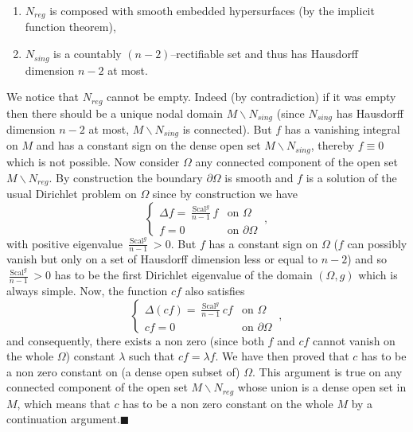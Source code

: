 \documentclass[a4paper,11pt,leqno]{amsart}
\numberwithin{equation}{section}
\theoremstyle{main}
\begin{document}
\begin{enumerate}
	\item $N_{reg}$ is composed with smooth embedded hypersurfaces (by the implicit function theorem),
	\item $N_{sing}$ is a countably $(n-2)$--rectifiable set and thus has Hausdorff dimension $n-2$ at most.
\end{enumerate}
We notice that $N_{reg}$ cannot be empty. Indeed (by contradiction) if it was empty then there should be a unique nodal domain $M\smallsetminus N_{sing}$ (since $N_{sing}$ has Hausdorff dimension $n-2$ at most, $M\smallsetminus N_{sing}$ is connected). But $f$ has a vanishing integral on $M$ and has a constant sign on the dense open set $M\smallsetminus N_{sing}$, thereby $f\equiv 0$ which is not possible. Now consider $\Omega$ any connected component of the open set $M\smallsetminus N_{reg}$. By construction the boundary $\partial\Omega$ is smooth and $f$ is a solution of the usual Dirichlet problem on $\Omega$ since by construction we have 
$$\left\{
\begin{array}{cl}
	\Delta f=\frac{{\operatorname{Scal}}^g}{n-1}f& \textrm{on } \Omega  \\
	f=0 & \textrm{on } \partial\Omega
\end{array}\right. \ ,$$
with positive eigenvalue $\frac{{\operatorname{Scal}}^g}{n-1}>0$. But $f$ has a constant sign on $\Omega$ ($f$ can possibly vanish but only on a set of Hausdorff dimension less or equal to $n-2$) and so $\frac{{\operatorname{Scal}}^g}{n-1}>0$ has to be the first Dirichlet eigenvalue of the domain $(\Omega,g)$ which is always simple. Now, the function $cf$ also satisfies
$$\left\{
\begin{array}{cl}
	\Delta (cf)=\frac{{\operatorname{Scal}}^g}{n-1}cf& \textrm{on } \Omega  \\
	cf=0 & \textrm{on } \partial\Omega
\end{array}\right. \ ,$$
and consequently, there exists a non zero (since both $f$ and $cf$ cannot vanish on the whole $\Omega$) constant $\lambda$ such that $cf=\lambda f$. We have then proved that $c$ has to be a non zero constant on (a dense open subset of) $\Omega$. This  argument is true on any connected component of the open set $M\smallsetminus N_{reg}$ whose union is a dense open set in $M$, which means that $c$ has to be a non zero constant on the whole $M$ by a continuation argument.{\hfill $\blacksquare$ \medskip \\}
\end{document}
